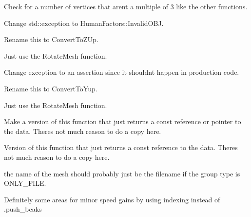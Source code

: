 \begin{DoxyRefList}
Check for a number of vertices that aren\textquotesingle{}t a multiple of 3 like the other functions.  
\item[Member \mbox{\hyperlink{a01127_a35a764d76bb738c933592dc95d475234}{HF\+::Geometry\+::Mesh\+Info\+::Add\+Verts}} (const std\+::vector$<$ std\+::array$<$ float, 3 $>$$>$ \&verts)]\label{a00264__todo000007}%
%
Change std\+::exception to Human\+Factors\+::\+Invalid\+O\+BJ.  
\item[Member \mbox{\hyperlink{a01127_a0b045826387ad47da69e5c098caf91dd}{HF\+::Geometry\+::Mesh\+Info\+::Convert\+To\+Rhino\+Coordinates}} ()]\label{a00264__todo000008}%
%
Rename this to Convert\+To\+Z\+Up. 

Just use the Rotate\+Mesh function. 

Change exception to an assertion since it shouldn\textquotesingle{}t happen in production code.  
\item[Member \mbox{\hyperlink{a01127_aa78330b65f42be9a33a6e58fa2717f73}{HF\+::Geometry\+::Mesh\+Info\+::Convert\+To\+O\+B\+J\+Coordinates}} ()]\label{a00264__todo000009}%
%
Rename this to Convert\+To\+Yup. 

Just use the Rotate\+Mesh function. 
\item[Member \mbox{\hyperlink{a01127_a3b5f835ab34b3fb98286db94059d6055}{HF\+::Geometry\+::Mesh\+Info\+::get\+Raw\+Vertices}} () const]\label{a00264__todo000010}%
%
 Make a version of this function that just returns a const reference or pointer to the data. There\textquotesingle{}s not much reason to do a copy here.  
\item[Member \mbox{\hyperlink{a01127_a6a48b289ce6a767ec332f0ab4ecf719a}{HF\+::Geometry\+::Mesh\+Info\+::get\+Raw\+Indices}} () const]\label{a00264__todo000011}%
%
 Version of this function that just returns a const reference to the data. There\textquotesingle{}s not much reason to do a copy here. 
\item[Member \mbox{\hyperlink{a00280_a6cd66262c11d9276be46e3fcd9a3a712}{HF\+::Geometry\+::Load\+Mesh\+Objects}} (std\+::string path, G\+R\+O\+U\+P\+\_\+\+M\+E\+T\+H\+OD gm=O\+N\+L\+Y\+\_\+\+F\+I\+LE, bool change\+\_\+coords=true)]\label{a00264__todo000012}%
%
the name of the mesh should probably just be the filename if the group type is O\+N\+L\+Y\+\_\+\+F\+I\+LE. 

Definitely some areas for minor speed gains by using indexing instead of .push\+\_\+bcaks 


\end{DoxyRefList}
